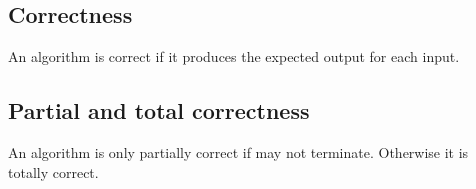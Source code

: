 
\subsection{Correctness}

An algorithm is correct if it produces the expected output for each input.

\subsection{Partial and total correctness}

An algorithm is only partially correct if may not terminate. Otherwise it is totally correct.

